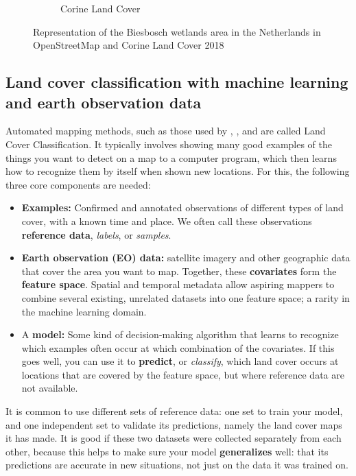 \begin{figure}[H]
\begin{subfigure}[b]{0.48\textwidth}
        \caption{Corine Land Cover}
        \label{fig:biesbosch_clc}
        \end{subfigure}
        \caption{Representation of the Biesbosch wetlands area in the Netherlands in OpenStreetMap and Corine Land Cover 2018}
        \label{fig:biesbosch_osm_clc} %
        \end{figure}

\subsection{Land cover classification with machine learning and earth observation data}
    
    Automated mapping methods, such as those used by \citet{pflugmacher2019mapping}, \citet{dandrimont2021parcel}, \citet{luo2022developing} and \citet{malinowski2020automated} are called Land Cover Classification. It typically involves showing many good examples of the things you want to detect on a map to a computer program, which then learns how to recognize them by itself when shown new locations. For this, the following three core components are needed:
    
    \begin{itemize}
    \item \textbf{Examples:} Confirmed and annotated observations of different types of land cover, with a known time and place. We often call these observations \textbf{reference data}, \textit{labels}, or \textit{samples}.
    \item \textbf{Earth observation (EO) data:} satellite imagery and other geographic data that cover the area you want to map. Together, these \textbf{covariates} form the \textbf{feature space}. Spatial and temporal metadata allow aspiring mappers to combine several existing, unrelated datasets into one feature space; a rarity in the machine learning domain.
    \item A \textbf{model:} Some kind of decision-making algorithm that learns to recognize which examples often occur at which combination of the covariates. If this goes well, you can use it to \textbf{predict}, or \textit{classify}, which land cover occurs at locations that are covered by the feature space, but where reference data are not available.
    \end{itemize}
    
    It is common to use different sets of reference data: one set to train your model, and one independent set to validate its predictions, namely the land cover maps it has made. It is good if these two datasets were collected separately from each other, because this helps to make sure your model \textbf{generalizes} well: that its predictions are accurate in new situations, not just on the data it was trained on.

